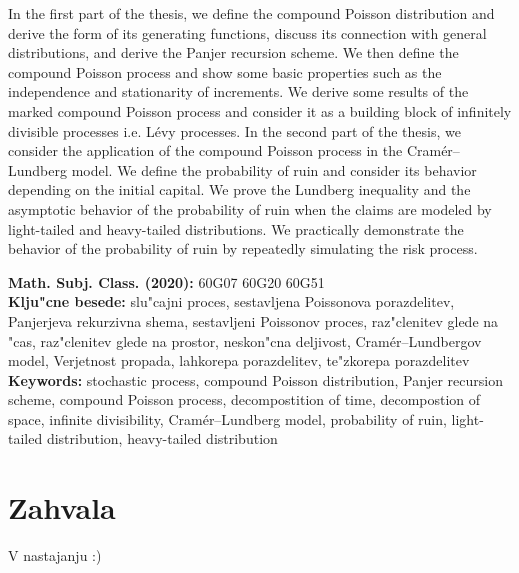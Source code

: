 \documentclass[12pt, a4paper, reqno]{amsart}
\theoremstyle{definition}
\theoremstyle{plain}
\newcommand{\1}{\mathds{1}}
\begin{document}
In the first part of the thesis, we define the compound Poisson distribution and derive the form of its
generating functions, discuss its connection with general distributions, and derive the Panjer recursion scheme.
We then define the compound Poisson process and show some basic properties such as the independence and
stationarity of increments. We derive some results of the marked compound Poisson process and consider it as a
building block of infinitely divisible processes i.e. Lévy processes. In the second part of the thesis, we
consider the application of the compound Poisson process in the Cramér--Lundberg model. We define the probability
of ruin and consider its behavior depending on the initial capital. We prove the Lundberg inequality and the
asymptotic behavior of the probability of ruin when the claims are modeled by light-tailed and heavy-tailed
distributions. We practically demonstrate the behavior of the probability of ruin by repeatedly
simulating the risk process.

\vfill\noindent
{\bf Math. Subj. Class. (2020):} 60G07 60G20 60G51 \\[1mm]
{\bf Klju"cne besede:} slu"cajni proces, sestavljena Poissonova porazdelitev, Panjerjeva rekurzivna shema, 
sestavljeni Poissonov proces, raz"clenitev glede na "cas, raz"clenitev glede na prostor,
neskon"cna deljivost, Cramér--Lundbergov model, Verjetnost propada, lahkorepa porazdelitev, te"zkorepa porazdelitev\\[1mm]
{\bf Keywords:} stochastic process, compound Poisson distribution, Panjer recursion scheme, 
compound Poisson process, decompostition of time, decompostion of space, infinite divisibility,
Cramér--Lundberg model, probability of ruin, light-tailed distribution, heavy-tailed distribution
\pagebreak


\section*{Zahvala}
V nastajanju :) 
%
%
\pagebreak
\end{document}
